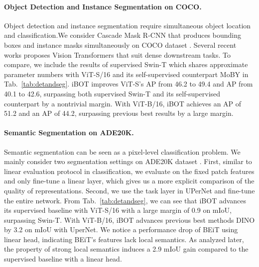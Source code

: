 \documentclass{article} \usepackage{iclr2022_conference,times}
\def\ourmethod{{iBOT}\xspace}
\begin{document}
\paragraph{Object Detection and Instance Segmentation on COCO.} 
Object detection and instance segmentation require simultaneous object location and classification.We consider Cascade Mask R-CNN \citep{cascadercnn,maskrcnn} that produces bounding boxes and instance masks simultaneously on COCO dataset \citep{coco}.  
Several recent works \citep{swin,pvt} proposes Vision Transformers that suit dense downstream tasks. To compare, we include the results of supervised Swin-T \citep{swin} which shares approximate parameter numbers with ViT-S/16 and its self-supervised counterpart MoBY \citep{moby} in Tab.~\ref{tab:detandseg}.
\ourmethod improves ViT-S's AP from 46.2 to 49.4 and AP from 40.1 to 42.6, surpassing both supervised Swin-T and its self-supervised counterpart by a nontrivial margin.
With ViT-B/16, \ourmethod achieves an AP of 51.2 and an AP of 44.2, surpassing previous best results by a large margin.

\paragraph{Semantic Segmentation on ADE20K.} 
Semantic segmentation can be seen as a pixel-level classification problem. We mainly consider two segmentation settings on ADE20K dataset \citep{ade20k}. 
First, similar to linear evaluation protocol in classification, we evaluate on the fixed patch features and only fine-tune a linear layer, which gives us a more explicit comparison of the quality of representations. 
Second, we use the task layer in UPerNet \citep{upernet} and fine-tune the entire network. 
From Tab.~\ref{tab:detandseg}, we can see that \ourmethod advances its supervised baseline with ViT-S/16 with a large margin of 0.9 on mIoU, surpassing Swin-T. With ViT-B/16, \ourmethod advances previous best methods DINO by 3.2 on mIoU with UperNet. We notice a performance drop of BEiT using linear head, indicating BEiT's features lack local semantics. As analyzed later, the property of strong local semantics induces a 2.9 mIoU gain compared to the supervised baseline with a linear head.
\end{document}

